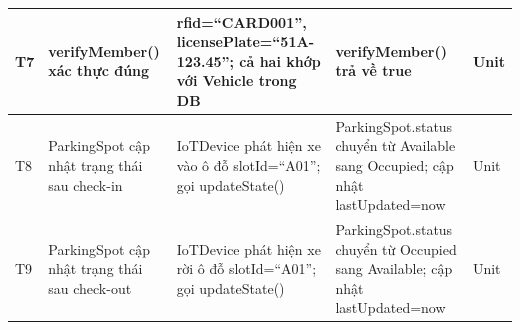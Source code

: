\begin{longtable}{C{1.3cm} L{3cm} L{4.5cm} L{5cm} C{2.0cm}}
T7 &
verifyMember() xác thực đúng &
rfid=``CARD001'', licensePlate=``51A-123.45''; cả hai khớp với Vehicle trong DB &
verifyMember() trả về true &
Unit \\
\midrule


T8 &
ParkingSpot cập nhật trạng thái sau check-in &
IoTDevice phát hiện xe vào ô đỗ slotId=``A01''; gọi updateState() &
ParkingSpot.status chuyển từ Available sang Occupied; cập nhật lastUpdated=now &
Unit \\
\midrule

T9 &
ParkingSpot cập nhật trạng thái sau check-out &
IoTDevice phát hiện xe rời ô đỗ slotId=``A01''; gọi updateState() &
ParkingSpot.status chuyển từ Occupied sang Available; cập nhật lastUpdated=now &
Unit \\

\end{longtable}
 
 